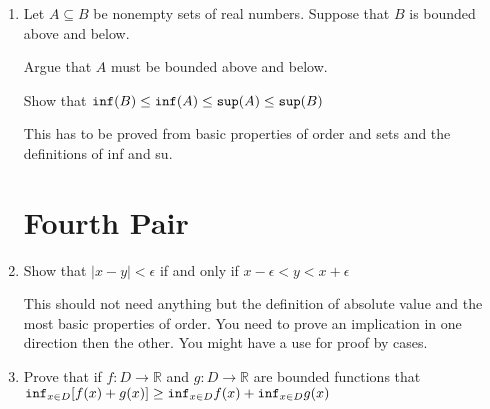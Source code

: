 \documentclass[12pt]{article}
\begin{document}
\begin{enumerate}
\newpage

\item 

Let $A \subseteq B$ be nonempty sets of real numbers.  Suppose that $B$ is bounded above and below.  

Argue that $A$ must be bounded above and below.

Show that ${\tt inf}(B) \leq {\tt inf}(A) \leq {\tt sup}(A) \leq {\tt sup}(B)$

This has to be proved from basic properties of order and sets and the definitions of inf and su.

\newpage

\section{Fourth Pair}

\item  Show that $|x-y|<\epsilon$ if and only if $x-\epsilon < y < x+\epsilon$

This should not need anything but the definition of absolute value and the most basic properties of order.  You need to prove an implication in one direction then the other.  You might have a use for proof by cases.

\newpage

\item  Prove that if $f:D \rightarrow \mathbb R$ and $g:D \rightarrow \mathbb R$ are bounded functions that
${\tt inf}_{x \in D}[f(x)+g(x)] \geq {\tt inf}_{x \in D}f(x) + {\tt inf}_{x \in D}g(x)$

\newpage

\end{enumerate}
\end{document}
